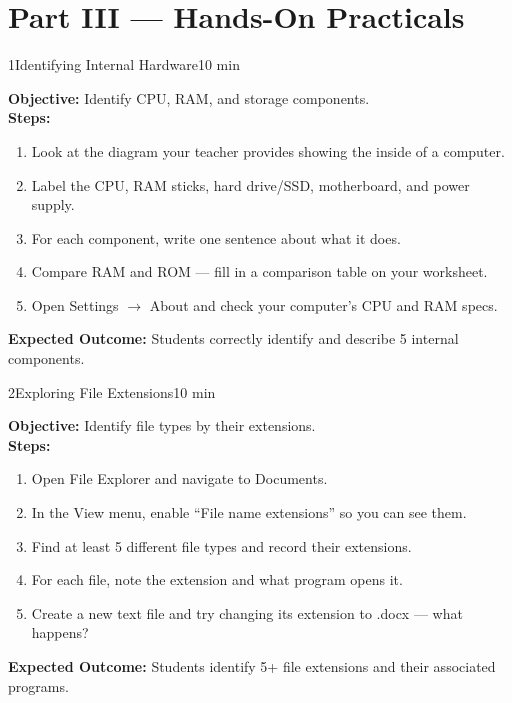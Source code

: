 
\chapter{Part III --- Hands-On Practicals}
\label{ch:lab3}


\begin{labactivity}{1}{Identifying Internal Hardware}{10 min}

\textbf{Objective:} Identify CPU, RAM, and storage components.\\[4pt]
\textbf{Steps:}
\begin{enumerate}[label=\protect\stepcircle{\arabic*}, leftmargin=2cm, itemsep=4pt]
  \item Look at the diagram your teacher provides showing the inside of a computer.
  \item Label the CPU, RAM sticks, hard drive/SSD, motherboard, and power supply.
  \item For each component, write one sentence about what it does.
  \item Compare RAM and ROM --- fill in a comparison table on your worksheet.
  \item Open Settings $\rightarrow$ About and check your computer's CPU and RAM specs.
\end{enumerate}
\textbf{Expected Outcome:} Students correctly identify and describe 5 internal components.
\welldone
\end{labactivity}

\begin{labactivity}{2}{Exploring File Extensions}{10 min}

\textbf{Objective:} Identify file types by their extensions.\\[4pt]
\textbf{Steps:}
\begin{enumerate}[label=\protect\stepcircle{\arabic*}, leftmargin=2cm, itemsep=4pt]
  \item Open File Explorer and navigate to Documents.
  \item In the View menu, enable ``File name extensions'' so you can see them.
  \item Find at least 5 different file types and record their extensions.
  \item For each file, note the extension and what program opens it.
  \item Create a new text file and try changing its extension to .docx --- what happens?
\end{enumerate}
\textbf{Expected Outcome:} Students identify 5+ file extensions and their associated programs.
\welldone
\end{labactivity}

